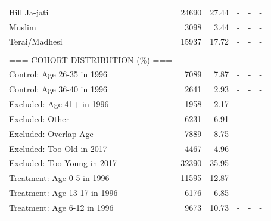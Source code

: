 \begin{table}[!h]
{\begin{tabular}[t]{lrrrrr}
Hill Ja-jati & 24690 & 27.44 & - & - & -\\
Muslim & 3098 & 3.44 & - & - & -\\
Terai/Madhesi & 15937 & 17.72 & - & - & -\\
 &  &  &  &  & \\
=== COHORT DISTRIBUTION (\%) === &  &  &  &  & \\
Control: Age 26-35 in 1996 & 7089 & 7.87 & - & - & -\\
Control: Age 36-40 in 1996 & 2641 & 2.93 & - & - & -\\
Excluded: Age 41+ in 1996 & 1958 & 2.17 & - & - & -\\
Excluded: Other & 6231 & 6.91 & - & - & -\\
Excluded: Overlap Age & 7889 & 8.75 & - & - & -\\
Excluded: Too Old in 2017 & 4467 & 4.96 & - & - & -\\
Excluded: Too Young in 2017 & 32390 & 35.95 & - & - & -\\
Treatment: Age 0-5 in 1996 & 11595 & 12.87 & - & - & -\\
Treatment: Age 13-17 in 1996 & 6176 & 6.85 & - & - & -\\
Treatment: Age 6-12 in 1996 & 9673 & 10.73 & - & - & -\\
\bottomrule
\end{tabular}
}
\end{table}